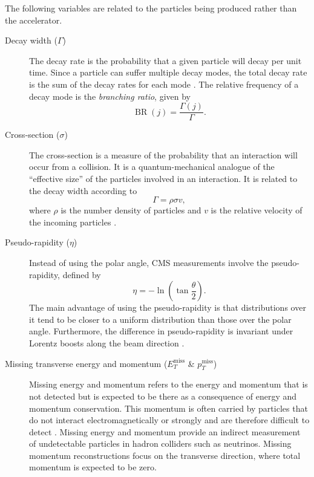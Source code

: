 The following variables are related to the particles being produced rather than the accelerator.
\begin{description}
    \item[Decay width ($\Gamma$)] The decay rate is the probability that a given particle will decay per unit time. Since a particle can suffer multiple decay modes, the total decay rate is the sum of the decay rates for each mode \cite{thomson_modern_2013}. The relative frequency of a decay mode is the \textit{branching ratio}, given by
    \begin{equation}
        \operatorname{BR}(j) = \frac{\Gamma(j)}{\Gamma}.
    \end{equation}
    
    \item[Cross-section ($\sigma$)] The cross-section is a measure of the probability that an interaction will occur from a collision. It is a quantum-mechanical analogue of the ``effective size'' of the particles involved in an interaction. It is related to the decay width according to
    \begin{equation}
        \Gamma = \rho\sigma v,
    \end{equation}
    where $\rho$ is the number density of particles and $v$ is the relative velocity of the incoming particles \cite{thomson_modern_2013}.
    
    \item[Pseudo-rapidity ($\eta$)] Instead of using the polar angle, CMS measurements involve the pseudo-rapidity, defined by
    \begin{equation}
        \eta = - \ln(\tan{\frac{\theta}{2}}).
    \end{equation}
    The main advantage of using the pseudo-rapidity is that distributions over it tend to be closer to a uniform distribution than those over the polar angle. Furthermore, the difference in pseudo-rapidity is invariant under Lorentz boosts along the beam direction \cite{thomson_modern_2013}.
    
    \item[Missing transverse energy and momentum ($E^{\mathrm{miss}}_T$ \& $p^{\mathrm{miss}}_T$)]
    Missing energy and momentum refers to the energy and momentum that is not detected but is expected to be there as a consequence of energy and momentum conservation. This momentum is often carried by particles that do not interact electromagnetically or strongly and are therefore difficult to detect \cite{thomson_modern_2013}. Missing energy and momentum provide an indirect measurement of undetectable particles in hadron colliders such as neutrinos. Missing momentum reconstructions focus on the transverse direction, where total momentum is expected to be zero.
    
\end{description}


